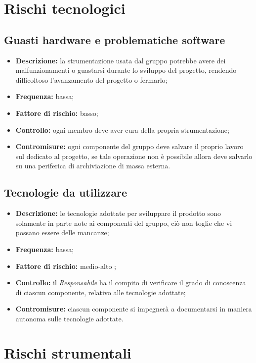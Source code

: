\documentclass[./PianodiProgetto.tex]{subfiles}
\begin{document}
	\section{Rischi tecnologici}
	\subsection{Guasti hardware e problematiche software}
	\begin{itemize}
		\item \textbf{Descrizione:} la strumentazione usata dal gruppo potrebbe avere dei malfunzionamenti o guastarsi durante lo sviluppo del progetto, rendendo difficoltoso l'avanzamento del progetto o fermarlo;
		\item \textbf{Frequenza:} bassa;
		\item \textbf{Fattore di rischio:} basso;
		\item \textbf{Controllo:} ogni membro deve aver cura della propria strumentazione;
		\item \textbf{Contromisure:} ogni componente del gruppo deve salvare il proprio lavoro sul   dedicato al progetto, se tale operazione non è possibile allora deve salvarlo su una periferica di archiviazione di massa esterna.
	\end{itemize}
	
	\subsection{Tecnologie da utilizzare}
	\begin{itemize}
		\item \textbf{Descrizione:} le tecnologie adottate per sviluppare il prodotto sono solamente in parte note ai componenti del gruppo, ciò non toglie che vi possano essere delle mancanze;
		\item \textbf{Frequenza:} bassa;
		\item \textbf{Fattore di rischio:} medio-alto ;
		\item \textbf{Controllo:} il \textit{Responsabile} ha il compito di verificare il grado di conoscenza di ciascun componente, relativo alle tecnologie adottate;
		\item \textbf{Contromisure:} ciascun componente si impegnerà a documentarsi in maniera autonoma sulle tecnologie adottate. 
	\end{itemize}
	
	\section{Rischi strumentali}
\end{document}
